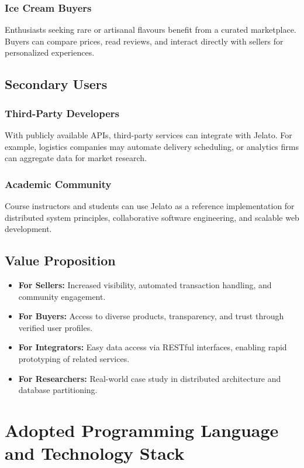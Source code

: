 \documentclass[12pt,a4paper]{report}
\begin{document}
\subsection*{Ice Cream Buyers}
Enthusiasts seeking rare or artisanal flavours benefit from a curated marketplace. Buyers can compare prices, read reviews, and interact directly with sellers for personalized experiences.

\section{Secondary Users}
\subsection*{Third-Party Developers}
With publicly available APIs, third-party services can integrate with Jelato. For example, logistics companies may automate delivery scheduling, or analytics firms can aggregate data for market research.

\subsection*{Academic Community}
Course instructors and students can use Jelato as a reference implementation for distributed system principles, collaborative software engineering, and scalable web development.

\section{Value Proposition}
\begin{itemize}
    \item \textbf{For Sellers:} Increased visibility, automated transaction handling, and community engagement.
    \item \textbf{For Buyers:} Access to diverse products, transparency, and trust through verified user profiles.
    \item \textbf{For Integrators:} Easy data access via RESTful interfaces, enabling rapid prototyping of related services.
    \item \textbf{For Researchers:} Real-world case study in distributed architecture and database partitioning.
\end{itemize}

\chapter{Adopted Programming Language and Technology Stack}
\end{document}
